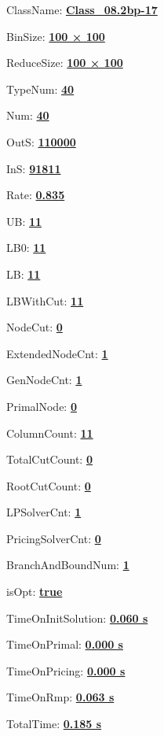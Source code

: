 \documentclass[11pt]{article}
\begin{document}
\pagestyle{empty}


ClassName: \underline{\textbf{Class_08.2bp-17}}
\par
BinSize: \underline{\textbf{100 × 100}}
\par
ReduceSize: \underline{\textbf{100 × 100}}
\par
TypeNum: \underline{\textbf{40}}
\par
Num: \underline{\textbf{40}}
\par
OutS: \underline{\textbf{110000}}
\par
InS: \underline{\textbf{91811}}
\par
Rate: \underline{\textbf{0.835}}
\par
UB: \underline{\textbf{11}}
\par
LB0: \underline{\textbf{11}}
\par
LB: \underline{\textbf{11}}
\par
LBWithCut: \underline{\textbf{11}}
\par
NodeCut: \underline{\textbf{0}}
\par
ExtendedNodeCnt: \underline{\textbf{1}}
\par
GenNodeCnt: \underline{\textbf{1}}
\par
PrimalNode: \underline{\textbf{0}}
\par
ColumnCount: \underline{\textbf{11}}
\par
TotalCutCount: \underline{\textbf{0}}
\par
RootCutCount: \underline{\textbf{0}}
\par
LPSolverCnt: \underline{\textbf{1}}
\par
PricingSolverCnt: \underline{\textbf{0}}
\par
BranchAndBoundNum: \underline{\textbf{1}}
\par
isOpt: \underline{\textbf{true}}
\par
TimeOnInitSolution: \underline{\textbf{0.060 s}}
\par
TimeOnPrimal: \underline{\textbf{0.000 s}}
\par
TimeOnPricing: \underline{\textbf{0.000 s}}
\par
TimeOnRmp: \underline{\textbf{0.063 s}}
\par
TotalTime: \underline{\textbf{0.185 s}}
\par
\newpage


\end{document}
